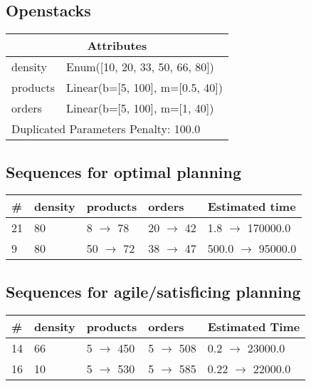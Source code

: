 \documentclass{article}
\begin{document}
                            \newpage \subsection{Openstacks}
                    \begin{center}
                    \begin{tabular}{@{}p{}p{}@{}}
                    \multicolumn{2}{c}{\bf \large Attributes}\\\midrule
                    density & Enum([10, 20, 33, 50, 66, 80])\\
products & Linear(b=[5, 100], m=[0.5, 40])\\
orders & Linear(b=[5, 100], m=[1, 40]) \\\midrule
                    \multicolumn{2}{l}{Duplicated Parameters Penalty: 100.0}
                    \end{tabular}
                    \end{center}
                
                            \subsection*{Sequences for optimal planning}

                            \begin{center}
                            \begin{tabular}{@{}l|l|l|l|l@{}}
                            \# & density & products & orders & Estimated time\\\midrule
                            21&80&8 $\rightarrow$ 78&20 $\rightarrow$ 42&1.8 $\rightarrow$ 170000.0\\
9&80&50 $\rightarrow$ 72&38 $\rightarrow$ 47&500.0 $\rightarrow$ 95000.0
                            \end{tabular}
                            \end{center}
                    
                         \subsection*{Sequences for agile/satisficing planning}

                        \begin{center}
                        \begin{tabular}{@{}l|l|l|l|l@{}}
                        \# & density & products & orders & Estimated Time\\\midrule
                        14&66&5 $\rightarrow$ 450&5 $\rightarrow$ 508&0.2 $\rightarrow$ 23000.0\\
16&10&5 $\rightarrow$ 530&5 $\rightarrow$ 585&0.22 $\rightarrow$ 22000.0
                        \end{tabular}
                        \end{center}
                    
\end{document}
